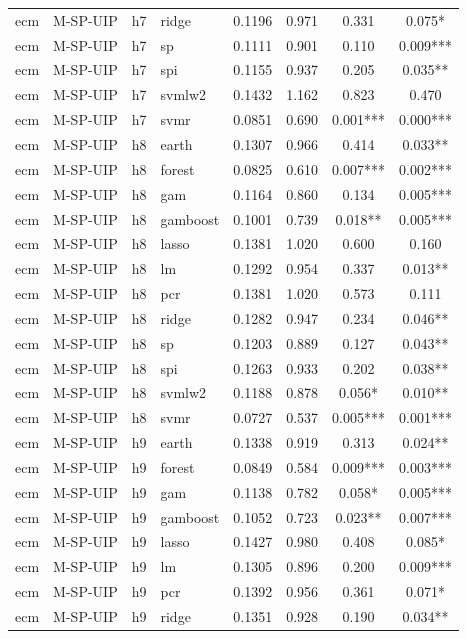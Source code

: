 \begin{ThreePartTable}
\begin{longtable}[t]{llclcccc}
ecm & M-SP-UIP & h7 & ridge & 0.1196 & 0.971 & 0.331 & 0.075*\\
ecm & M-SP-UIP & h7 & sp & 0.1111 & 0.901 & 0.110 & 0.009***\\
ecm & M-SP-UIP & h7 & spi & 0.1155 & 0.937 & 0.205 & 0.035**\\
ecm & M-SP-UIP & h7 & svmlw2 & 0.1432 & 1.162 & 0.823 & 0.470\\
ecm & M-SP-UIP & h7 & svmr & 0.0851 & 0.690 & 0.001*** & 0.000***\\
\addlinespace
ecm & M-SP-UIP & h8 & earth & 0.1307 & 0.966 & 0.414 & 0.033**\\
ecm & M-SP-UIP & h8 & forest & 0.0825 & 0.610 & 0.007*** & 0.002***\\
ecm & M-SP-UIP & h8 & gam & 0.1164 & 0.860 & 0.134 & 0.005***\\
ecm & M-SP-UIP & h8 & gamboost & 0.1001 & 0.739 & 0.018** & 0.005***\\
ecm & M-SP-UIP & h8 & lasso & 0.1381 & 1.020 & 0.600 & 0.160\\
ecm & M-SP-UIP & h8 & lm & 0.1292 & 0.954 & 0.337 & 0.013**\\
ecm & M-SP-UIP & h8 & pcr & 0.1381 & 1.020 & 0.573 & 0.111\\
ecm & M-SP-UIP & h8 & ridge & 0.1282 & 0.947 & 0.234 & 0.046**\\
ecm & M-SP-UIP & h8 & sp & 0.1203 & 0.889 & 0.127 & 0.043**\\
ecm & M-SP-UIP & h8 & spi & 0.1263 & 0.933 & 0.202 & 0.038**\\
ecm & M-SP-UIP & h8 & svmlw2 & 0.1188 & 0.878 & 0.056* & 0.010**\\
ecm & M-SP-UIP & h8 & svmr & 0.0727 & 0.537 & 0.005*** & 0.001***\\
\addlinespace
ecm & M-SP-UIP & h9 & earth & 0.1338 & 0.919 & 0.313 & 0.024**\\
ecm & M-SP-UIP & h9 & forest & 0.0849 & 0.584 & 0.009*** & 0.003***\\
ecm & M-SP-UIP & h9 & gam & 0.1138 & 0.782 & 0.058* & 0.005***\\
ecm & M-SP-UIP & h9 & gamboost & 0.1052 & 0.723 & 0.023** & 0.007***\\
ecm & M-SP-UIP & h9 & lasso & 0.1427 & 0.980 & 0.408 & 0.085*\\
ecm & M-SP-UIP & h9 & lm & 0.1305 & 0.896 & 0.200 & 0.009***\\
ecm & M-SP-UIP & h9 & pcr & 0.1392 & 0.956 & 0.361 & 0.071*\\
ecm & M-SP-UIP & h9 & ridge & 0.1351 & 0.928 & 0.190 & 0.034**\\

\end{longtable}
\end{ThreePartTable}
